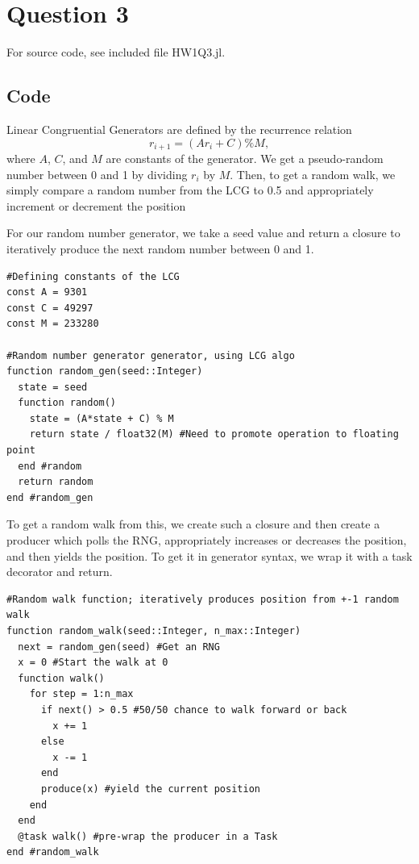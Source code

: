 \documentclass{article}
\begin{document}
\section{Question 3}
For source code, see included file HW1Q3.jl.
\subsection{Code}
Linear Congruential Generators are defined by the recurrence relation
$$ r_{i+1} = (Ar_i + C) \% M,$$
where $A$, $C$, and $M$ are constants of the generator. We get a pseudo-random number between 0 and 1 by dividing $r_i$ by $M$. Then, to get a random walk, we simply compare a random number from the LCG to 0.5 and appropriately increment or decrement the position

For our random number generator, we take a seed value and return a closure to iteratively produce the next random number between 0 and 1.
\begin{lstlisting}
#Defining constants of the LCG
const A = 9301
const C = 49297
const M = 233280

#Random number generator generator, using LCG algo
function random_gen(seed::Integer)
  state = seed
  function random()
    state = (A*state + C) % M
    return state / float32(M) #Need to promote operation to floating point
  end #random
  return random
end #random_gen
\end{lstlisting}
To get a random walk from this, we create such a closure and then create a producer which polls the RNG, appropriately increases or decreases the position, and then yields the position. To get it in generator syntax, we wrap it with a task decorator and return.
\begin{lstlisting}
#Random walk function; iteratively produces position from +-1 random walk
function random_walk(seed::Integer, n_max::Integer)
  next = random_gen(seed) #Get an RNG
  x = 0 #Start the walk at 0
  function walk()
    for step = 1:n_max
      if next() > 0.5 #50/50 chance to walk forward or back
        x += 1
      else
        x -= 1
      end
      produce(x) #yield the current position
    end
  end
  @task walk() #pre-wrap the producer in a Task
end #random_walk
\end{lstlisting}
\end{document}
